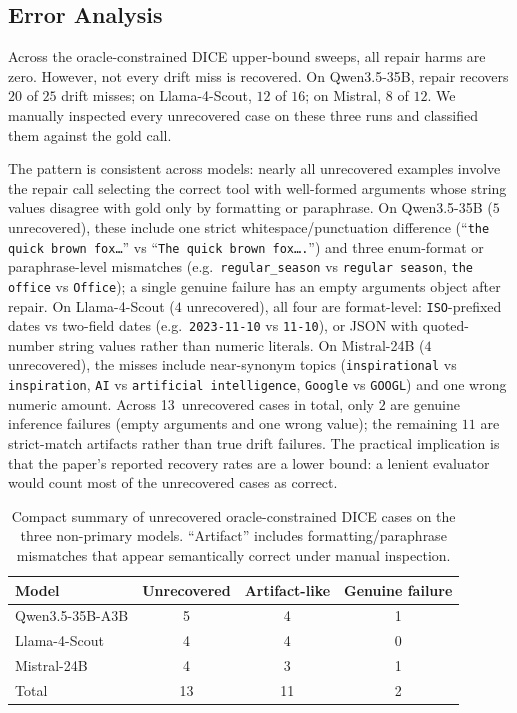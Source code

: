 \documentclass[runningheads]{llncs}
\begin{document}
\subsection{Error Analysis}
\label{sec:error-analysis}
Across the oracle-constrained DICE upper-bound sweeps, all repair harms are zero.
However, not every drift miss is recovered. On Qwen3.5-35B, repair recovers $20$ of
$25$ drift misses; on Llama-4-Scout, $12$ of $16$; on Mistral, $8$ of $12$. We
manually inspected every unrecovered case on these three runs and classified them
against the gold call.

The pattern is consistent across models: nearly all unrecovered examples
involve the repair call selecting the correct tool with well-formed arguments
whose string values disagree with gold only by formatting or paraphrase. On
Qwen3.5-35B ($5$ unrecovered), these include one strict whitespace/punctuation
difference (``\texttt{the quick brown fox\ldots}'' vs
``\texttt{The quick brown fox\ldots.}'') and three enum-format or
paraphrase-level mismatches (e.g.\ \texttt{regular\_season} vs
\texttt{regular season}, \texttt{the office} vs \texttt{Office}); a single
genuine failure has an empty arguments object after repair. On Llama-4-Scout
($4$ unrecovered), all four are format-level: \texttt{ISO}-prefixed dates
vs two-field dates (e.g.\ \texttt{2023-11-10} vs \texttt{11-10}), or JSON
with quoted-number string values rather than numeric literals. On Mistral-24B
($4$ unrecovered), the misses include near-synonym topics (\texttt{inspirational}
vs \texttt{inspiration}, \texttt{AI} vs \texttt{artificial intelligence},
\texttt{Google} vs \texttt{GOOGL}) and one wrong numeric amount. Across
13~unrecovered cases in total, only $2$ are genuine inference failures
(empty arguments and one wrong value); the remaining $11$ are strict-match
artifacts rather than true drift failures. The practical implication is that
the paper's reported recovery rates are a lower bound: a lenient evaluator
would count most of the unrecovered cases as correct.

\begin{table}[t]
\caption{Compact summary of unrecovered oracle-constrained DICE cases on the
three non-primary models. ``Artifact'' includes formatting/paraphrase mismatches
that appear semantically correct under manual inspection.}
\label{tab:unrecovered-summary}
\centering
\small
\begin{tabular}{lccc}
\toprule
Model & Unrecovered & Artifact-like & Genuine failure \\
\midrule
Qwen3.5-35B-A3B & 5 & 4 & 1 \\
Llama-4-Scout   & 4 & 4 & 0 \\
Mistral-24B     & 4 & 3 & 1 \\
\midrule
Total           & 13 & 11 & 2 \\
\bottomrule
\end{tabular}
\end{table}
\end{document}
